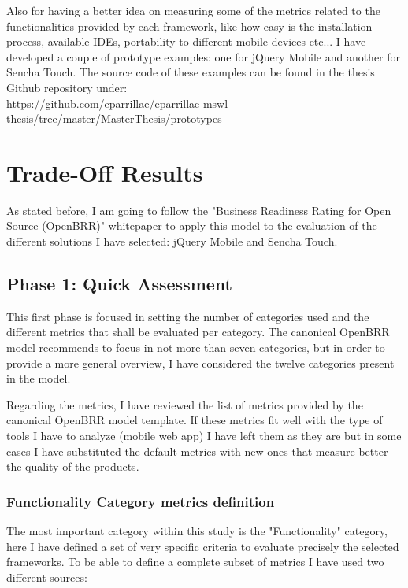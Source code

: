\documentclass[a4paper,12pt]{book}
\begin{document}
Also for having a better idea on measuring some of the metrics related to the functionalities provided by each framework, like how easy is the installation process, available IDEs, portability to different mobile devices etc... I have developed a couple of prototype examples: one for jQuery Mobile and another for Sencha Touch. The source code of these examples can be found in the thesis Github repository under:\\

\url{https://github.com/eparrillae/eparrillae-mswl-thesis/tree/master/MasterThesis/prototypes}


\chapter{Trade-Off Results}
\label{chap:results}

As stated before, I am going to follow the "Business Readiness Rating for Open Source
(OpenBRR)" whitepaper\cite{OpenBRRWhitepaper} to apply this model to the evaluation of the different solutions I have selected: jQuery Mobile and Sencha Touch.

\section{Phase 1: Quick Assessment}
\label{sec:phase1}
This first phase is focused in setting the number of categories used and the different metrics that shall be evaluated per category. The canonical OpenBRR model recommends to focus in not more than seven categories, but in order to provide a more general overview, I have considered the twelve categories present in the model.

Regarding the metrics, I have reviewed the list of metrics provided by the canonical OpenBRR model template. If these metrics fit well with the type of tools I have to analyze (mobile web app) I have left them as they are but in some cases I have substituted the default metrics with new ones that measure better the quality of the products.

\subsection{Functionality Category metrics definition}
\label{Functionality Category metrics definition}

The most important category within this study is the "Functionality" category, here I have defined a set of very specific criteria to evaluate precisely the selected frameworks. To be able to define a complete subset of metrics I have used two different sources:
\end{document}
